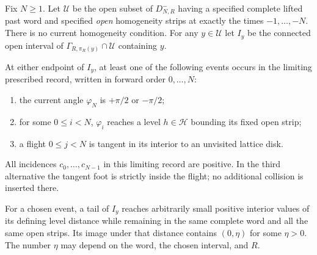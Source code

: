 Fix $N\ge1$.  Let $\mathcal U$ be the open subset of $D^-_{N,R}$
having a specified complete lifted past word and specified
\emph{open} homogeneity strips at exactly the times
$-1,\ldots,-N$.  There is no current homogeneity condition.
For any $y\in\mathcal U$ let $I_y$ be the connected open interval of
$\Gamma_{R,\pi_R(y)}\cap\mathcal U$ containing $y$.

\begin{lemma}
\label{ps:exit}
At either endpoint of $I_y$, at least one of the following events
occurs in the limiting prescribed record, written in forward order
$0,\ldots,N$:
\begin{enumerate}
\item the current angle $\varphi_N$ is $+\pi/2$ or $-\pi/2$;
\item for some $0\le i<N$, $\varphi_i$ reaches a level
      $h\in\mathcal H$ bounding its fixed open strip;
\item a flight $0\le j<N$ is tangent in its interior to an unvisited
      lattice disk.
\end{enumerate}
All incidences $c_0,\ldots,c_{N-1}$ in this limiting record are
positive.  In the third alternative the tangent foot is strictly
inside the flight; no additional collision is inserted there.

For a chosen event, a tail of $I_y$ reaches arbitrarily small
positive interior values of its defining level distance while
remaining in the same complete word and all the same open strips.
Its image under that distance contains $(0,\eta)$ for some
$\eta>0$.  The number $\eta$ may depend on the word, the chosen
interval, and $R$.
\end{lemma}

